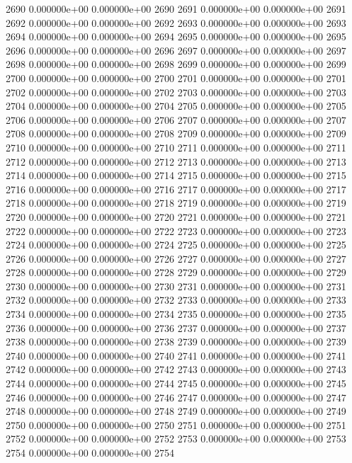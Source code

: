 \documentclass{article}
\begin{document}
\begin{Schunk}
\begin{Soutput}
2690   0.000000e+00   0.000000e+00 2690
2691   0.000000e+00   0.000000e+00 2691
2692   0.000000e+00   0.000000e+00 2692
2693   0.000000e+00   0.000000e+00 2693
2694   0.000000e+00   0.000000e+00 2694
2695   0.000000e+00   0.000000e+00 2695
2696   0.000000e+00   0.000000e+00 2696
2697   0.000000e+00   0.000000e+00 2697
2698   0.000000e+00   0.000000e+00 2698
2699   0.000000e+00   0.000000e+00 2699
2700   0.000000e+00   0.000000e+00 2700
2701   0.000000e+00   0.000000e+00 2701
2702   0.000000e+00   0.000000e+00 2702
2703   0.000000e+00   0.000000e+00 2703
2704   0.000000e+00   0.000000e+00 2704
2705   0.000000e+00   0.000000e+00 2705
2706   0.000000e+00   0.000000e+00 2706
2707   0.000000e+00   0.000000e+00 2707
2708   0.000000e+00   0.000000e+00 2708
2709   0.000000e+00   0.000000e+00 2709
2710   0.000000e+00   0.000000e+00 2710
2711   0.000000e+00   0.000000e+00 2711
2712   0.000000e+00   0.000000e+00 2712
2713   0.000000e+00   0.000000e+00 2713
2714   0.000000e+00   0.000000e+00 2714
2715   0.000000e+00   0.000000e+00 2715
2716   0.000000e+00   0.000000e+00 2716
2717   0.000000e+00   0.000000e+00 2717
2718   0.000000e+00   0.000000e+00 2718
2719   0.000000e+00   0.000000e+00 2719
2720   0.000000e+00   0.000000e+00 2720
2721   0.000000e+00   0.000000e+00 2721
2722   0.000000e+00   0.000000e+00 2722
2723   0.000000e+00   0.000000e+00 2723
2724   0.000000e+00   0.000000e+00 2724
2725   0.000000e+00   0.000000e+00 2725
2726   0.000000e+00   0.000000e+00 2726
2727   0.000000e+00   0.000000e+00 2727
2728   0.000000e+00   0.000000e+00 2728
2729   0.000000e+00   0.000000e+00 2729
2730   0.000000e+00   0.000000e+00 2730
2731   0.000000e+00   0.000000e+00 2731
2732   0.000000e+00   0.000000e+00 2732
2733   0.000000e+00   0.000000e+00 2733
2734   0.000000e+00   0.000000e+00 2734
2735   0.000000e+00   0.000000e+00 2735
2736   0.000000e+00   0.000000e+00 2736
2737   0.000000e+00   0.000000e+00 2737
2738   0.000000e+00   0.000000e+00 2738
2739   0.000000e+00   0.000000e+00 2739
2740   0.000000e+00   0.000000e+00 2740
2741   0.000000e+00   0.000000e+00 2741
2742   0.000000e+00   0.000000e+00 2742
2743   0.000000e+00   0.000000e+00 2743
2744   0.000000e+00   0.000000e+00 2744
2745   0.000000e+00   0.000000e+00 2745
2746   0.000000e+00   0.000000e+00 2746
2747   0.000000e+00   0.000000e+00 2747
2748   0.000000e+00   0.000000e+00 2748
2749   0.000000e+00   0.000000e+00 2749
2750   0.000000e+00   0.000000e+00 2750
2751   0.000000e+00   0.000000e+00 2751
2752   0.000000e+00   0.000000e+00 2752
2753   0.000000e+00   0.000000e+00 2753
2754   0.000000e+00   0.000000e+00 2754

\end{Soutput}
\end{Schunk}
\end{document}
